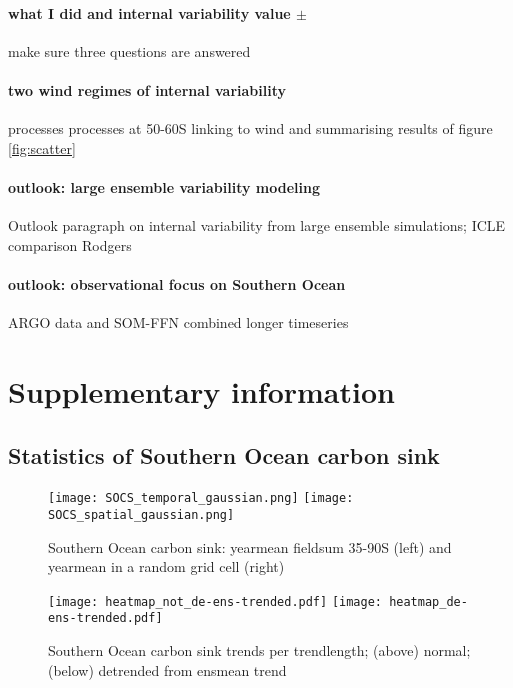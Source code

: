\documentclass[12pt]{article}
\begin{document}
\paragraph{what I did and internal variability value $\pm$} make sure three questions are answered

\paragraph{two wind regimes of internal variability} processes processes at 50-60S linking to wind and summarising results of figure \ref{fig:scatter}

\paragraph{outlook: large ensemble variability modeling}
Outlook paragraph on internal variability from large ensemble simulations; ICLE comparison Rodgers

\paragraph{outlook: observational focus on Southern Ocean} ARGO data and SOM-FFN combined longer timeseries


\clearpage

\baselineskip18pt
%



\clearpage

\listoffigures

\clearpage

\section*{Supplementary information}

\subsection*{Statistics of Southern Ocean carbon sink}

\begin{figure}[h]
	\texttt{[image: SOCS\_temporal\_gaussian.png]} %
	\texttt{[image: SOCS\_spatial\_gaussian.png]} %
	\caption{Southern Ocean carbon sink: yearmean fieldsum 35-90S (left) and yearmean in a random grid cell (right)}
	\label{fig:SOCS_temporal_gaussian}
\end{figure}

\begin{figure}[h]
	\texttt{[image: heatmap\_not\_de-ens-trended.pdf]} %
	\texttt{[image: heatmap\_de-ens-trended.pdf]} %
\caption{Southern Ocean carbon sink trends per trendlength; (above) normal; (below) detrended from ensmean trend}
	\label{fig:heatmap}
\end{figure}
\end{document}

